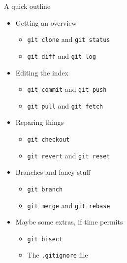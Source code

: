 \documentclass{beamer}
\begin{document}
\begin{frame}{A quick outline}

  \begin{itemize}
  \item Getting an overview
    \begin{itemize}
    \item \texttt{git clone} and \texttt{git status}
    \item \texttt{git diff} and \texttt{git log}
    \end{itemize}
  \item Editing the index
    \begin{itemize}
    \item \texttt{git commit} and \texttt{git push}
    \item \texttt{git pull} and \texttt{git fetch}
    \end{itemize}
  \item Reparing things
    \begin{itemize}
    \item \texttt{git checkout}
    \item \texttt{git revert} and \texttt{git reset}
    \end{itemize}
  \item Branches and fancy stuff
    \begin{itemize}
    \item \texttt{git branch}
    \item \texttt{git merge} and \texttt{git rebase}
    \end{itemize}
  \item Maybe some extras, if time permits
    \begin{itemize}
    \item \texttt{git bisect}
    \item The \texttt{.gitignore} file
    \end{itemize}
  \end{itemize}

\end{frame}
\end{document}
